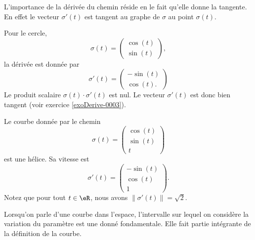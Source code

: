 L'importance de la dérivée du chemin réside en le fait qu'elle donne la tangente. En effet le vecteur $\sigma'(t)$ est tangent au graphe de $\sigma$ au point $\sigma(t)$.
\begin{example}
    Pour le cercle,
    \begin{equation}
        \sigma(t)=\begin{pmatrix}
            \cos(t)    \\ 
            \sin(t)    
        \end{pmatrix},
    \end{equation}
    la dérivée est donnée par
    \begin{equation}
        \sigma'(t)=\begin{pmatrix}
            -\sin(t)    \\ 
            \cos(t).    
        \end{pmatrix}
    \end{equation}
    Le produit scalaire $\sigma(t)\cdot \sigma'(t)$ est nul. Le vecteur $\sigma'(t)$ est donc bien tangent (voir exercice \ref{exoDerive-0003}).
\end{example}

\begin{example}
    Le courbe donnée par le chemin
    \begin{equation}
        \sigma(t)=\begin{pmatrix}
            \cos(t)    \\ 
            \sin(t)    \\ 
            t    
        \end{pmatrix}
    \end{equation}
    est une hélice. Sa vitesse est
    \begin{equation}
        \sigma'(t)=\begin{pmatrix}
            -\sin(t)    \\ 
            \cos(t)    \\ 
            1    
        \end{pmatrix}.
    \end{equation}
    Notez que pour tout $t\in\eR$, nous avons $\| \sigma'(t) \|=\sqrt{2}$.
\end{example}

\begin{remark}
    Lorsqu'on parle d'une courbe dans l'espace, l'intervalle sur lequel on considère la variation du paramètre est une donné fondamentale. Elle fait partie intégrante de la définition de la courbe.
\end{remark}

